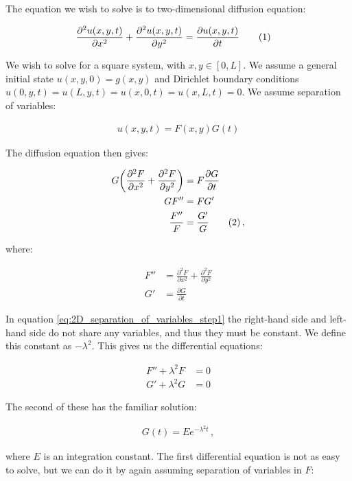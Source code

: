 \documentclass[reprint,english,notitlepage]{revtex4-1}  %
\newcommand\numberthis{\addtocounter{equation}{1}\tag{\theequation}}
\begin{document}
The equation we wish to solve is to two-dimensional diffusion equation:

\begin{align*}
\frac{\partial^2 u(x,y,t)}{\partial x^2} + \frac{\partial^2 u(x,y,t)}{\partial y^2} &= \frac{\partial u(x,y,t)}{\partial t} \numberthis \label{eq:2D_diffusion_equation}
\end{align*}

We wish to solve for a square system, with $x,y \in [0,L]$. We assume a general initial state $u(x,y,0) = g(x,y)$ and Dirichlet boundary conditions $u(0,y,t) = u(L,y,t) = u(x,0,t) = u(x,L,t) = 0$. We assume separation of variables:

\begin{align*}
u(x,y,t) = F(x,y) G(t)
\end{align*}

The diffusion equation then gives:

\begin{align*}
G\bigg( \frac{\partial^2 F}{\partial x^2} + \frac{\partial^2 F}{\partial y^2} \bigg) &= F\frac{\partial G}{\partial t} \\
GF'' &= FG'\\
\frac{F''}{F} &= \frac{G'}{G} \numberthis \label{eq:2D_separation_of_variables_step1} \, ,
\end{align*}

where:

\begin{align*}
F'' &= \frac{\partial^2 F}{\partial x^2} + \frac{\partial^2 F}{\partial y^2} \\
G' &= \frac{\partial G}{\partial t}
\end{align*}

In equation \eqref{eq:2D_separation_of_variables_step1} the right-hand side and left-hand side do not share any variables, and thus they must be constant. We define this constant as $-\lambda^2$. This gives us the differential equations:

\begin{align*}
F'' + \lambda^2 F &= 0 \\
G' + \lambda^2 G &= 0
\end{align*}

The second of these has the familiar solution:

\begin{align*}
G(t) = Ee^{-\lambda^2 t} \, ,
\end{align*}

where $E$ is an integration constant. The first differential equation is not as easy to solve, but we can do it by again assuming separation of variables in $F$:
\end{document}
